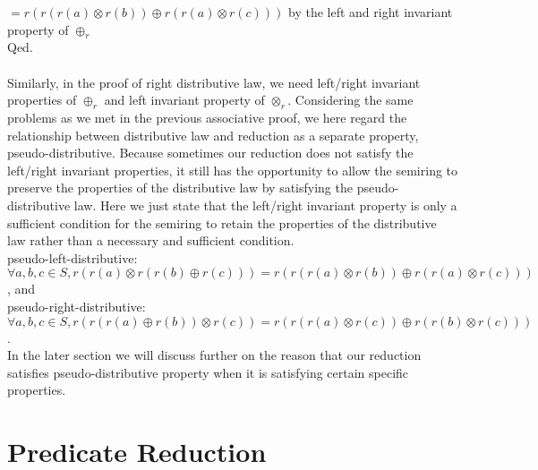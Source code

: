 \documentclass[a4paper,10pt]{article}
\begin{document}
$= r(r(r(a) \otimes r(b)) \oplus r(r(a) \otimes r(c))) $ by the left and right invariant property of $\oplus_r$\\
Qed.\\\\
Similarly, in the proof of right distributive law, we need left/right invariant properties of $\oplus_r$ and left invariant property of $\otimes_r$.
Considering the same problems as we met in the previous associative proof, we here regard the relationship between distributive law and reduction as a separate property, pseudo-distributive.
Because sometimes our reduction does not satisfy the left/right invariant properties, it still has the opportunity to allow the semiring to preserve the properties of the distributive law by satisfying the pseudo-distributive law. Here we just state that the left/right invariant property is only a sufficient condition for the semiring to retain the properties of the distributive law rather than a necessary and sufficient condition. \\
pseudo-left-distributive: $\forall a,b,c \in S, r(r(a) \otimes r(r(b)\oplus r(c))) = r(r(r(a) \otimes r(b)) \oplus r(r(a) \otimes r(c)))$, and \\
pseudo-right-distributive: $\forall a,b,c \in S, r(r(r(a) \oplus r(b)) \otimes r(c)) = r(r(r(a) \otimes r(c)) \oplus r(r(b) \otimes r(c)))$. \\
In the later section we will discuss further on the reason that our reduction satisfies pseudo-distributive property when it is satisfying certain specific properties.
\section{Predicate Reduction}
\end{document}
